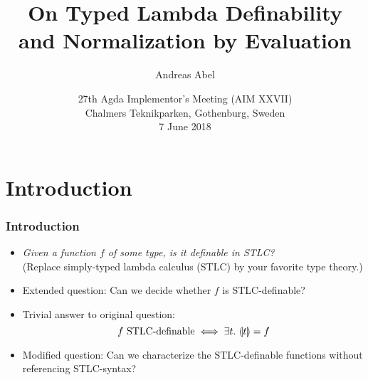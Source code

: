 \documentclass[t,fleqn,usenames,dvipsnames]{beamer}
\title[Typed Lambda Definability]{%
On Typed Lambda Definability \\ and Normalization by Evaluation}
\author[Abel]{
  Andreas Abel\inst{1}
}
\institute[] %
{
  \inst{1}
  Department of Computer Science and Engineering\\
  Chalmers and Gothenburg University, Sweden \\[1ex]
}
\date[Nijmegen 2018] %
{ 27th Agda Implementor's Meeting (AIM XXVII) \\
  Chalmers Teknikparken, Gothenburg, Sweden \\
  7 June 2018
}
\newcommand{\cAnn}{\color{red!80!black}}%
\renewcommand{\emph}[1]{{\cAnn#1}}
\newcommand{\cType}{\color{orange!60!black}}
\renewcommand{\emph}[1]{\textit{\cType#1}}
\begin{document}
\maketitle


%
%
%
%




\section{Introduction}


\begin{frame}%
  \frametitle{Introduction}
  \begin{itemize}
  \item \emph{Given a function $f$ of some type, is it definable in STLC?} \\
   (Replace simply-typed lambda calculus (STLC) by your favorite
    type theory.)
  \item Extended question: Can we decide whether $f$ is STLC-definable?
  \item Trivial answer to original question:
\[
  f \mbox{ STLC-definable} \iff \exists t.\ \llparenthesis t\rrparenthesis = f
\]
\vspace{-2ex}
  \item Modified question: Can we characterize the STLC-definable
    functions without referencing STLC-syntax?
  \end{itemize}
\end{frame}
\end{document}
